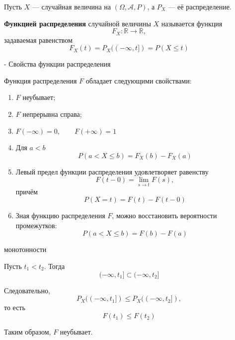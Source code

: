\documentclass[12pt,a4paper]{article}
\begin{document}
\begin{definition}

Пусть $X$ --- случайная величина на $(\Omega,\mathcal{A},P)$, а $P_X$ --- её распределение.

\textbf{Функцией распределения} случайной величины $X$ называется функция
\[
F_X:\mathbb{R}\to\mathbb{R},
\]
задаваемая равенством
\[
F_X(t)
=
P_X((-\infty,t])
=
P(X\leq t)
\]

\end{definition}

\begin{theorem}{ - Свойства функции распределения}

Функция распределения $F$ обладает следующими свойствами:

\begin{enumerate}
    \item $F$ неубывает;
    \item $F$ непрерывна справа;
    \item
    $F(-\infty)=0,
    \qquad
    F(+\infty)=1$
    \item Для $a<b$
    \[
    P(a<X\leq b)=F_X(b)-F_X(a)
    \]

    \item Левый предел функции распределения удовлетворяет равенству
    \[
    F(t-0)=\lim_{s\rightarrow t}F(s),
    \]
    причём
    \[
    P(X=t)=F(t)-F(t-0)
    \]

    \item Зная функцию распределения $F$, можно восстановить вероятности промежутков:
    \[
    P(a<X\leq b)=F(b)-F(a)
    \]
\end{enumerate}

\end{theorem}

\begin{proofbox}{монотонности}

Пусть $t_1<t_2$. Тогда
\[
(-\infty,t_1]\subset(-\infty,t_2]
\]

Следовательно,
\[
P_X((-\infty,t_1])
\leq
P_X((-\infty,t_2]),
\]
то есть
\[
F(t_1)\leq F(t_2)
\]

Таким образом, $F$ неубывает.

\end{proofbox}
\end{document}
